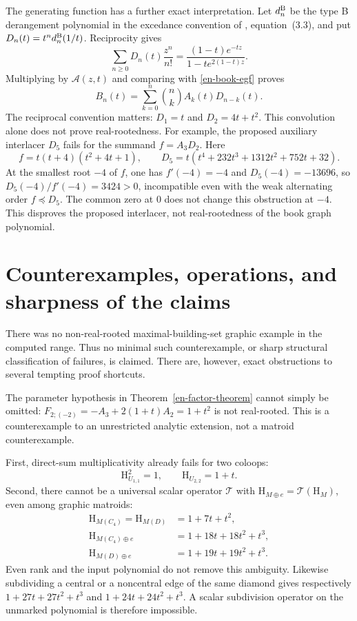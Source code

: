\documentclass[12pt]{amsart}
\theoremstyle{definition}
\theoremstyle{remark}
\numberwithin{equation}{section}
\newcommand{\HCh}{\mathrm{H}}
\begin{document}
The generating function has a further exact interpretation. Let $d_n^{\rm B}$ be the type B derangement polynomial in the excedance convention of \cite{Ma20}, equation~(3.3), and put $D_n(t)=t^n d_n^{\rm B}(1/t)$. Reciprocity gives
\[
 \sum_{n\geq0}D_n(t)\frac{z^n}{n!}
 =\frac{(1-t)e^{-tz}}{1-t e^{2(1-t)z}}.
\]
Multiplying by $\mathcal A(z,t)$ and comparing with \eqref{en-book-egf} proves
\begin{equation}\label{en-book-convolution}
 B_n(t)=\sum_{k=0}^n\binom nk A_k(t)D_{n-k}(t).
\end{equation}
The reciprocal convention matters: $D_1=t$ and $D_2=4t+t^2$. This convolution alone does not prove real-rootedness. For example, the proposed auxiliary interlacer $D_5$ fails for the summand $f=A_3D_2$. Here
\[
 f=t(t+4)(t^2+4t+1),\qquad
 D_5=t(t^4+232t^3+1312t^2+752t+32).
\]
At the smallest root $-4$ of $f$, one has $f'(-4)=-4$ and $D_5(-4)=-13696$, so $D_5(-4)/f'(-4)=3424>0$, incompatible even with the weak alternating order $f\preceq D_5$. The common zero at $0$ does not change this obstruction at $-4$. This disproves the proposed interlacer, not real-rootedness of the book graph polynomial.

\section{Counterexamples, operations, and sharpness of the claims}
There was no non-real-rooted maximal-building-set graphic example in the computed range. Thus no minimal such counterexample, or sharp structural classification of failures, is claimed. There are, however, exact obstructions to several tempting proof shortcuts.

The parameter hypothesis in Theorem~\ref{en-factor-theorem} cannot simply be omitted: $F_{2;(-2)}=-A_3+2(1+t)A_2=1+t^2$ is not real-rooted. This is a counterexample to an unrestricted analytic extension, not a matroid counterexample.

First, direct-sum multiplicativity already fails for two coloops:
\[
 \HCh_{U_{1,1}}^2=1,\qquad \HCh_{U_{2,2}}=1+t.
\]
Second, there cannot be a universal scalar operator $\mathcal T$ with $\HCh_{M\oplus e}=\mathcal T(\HCh_M)$, even among graphic matroids:
\begin{align*}
 \HCh_{M(C_4)}=\HCh_{M(D)}&=1+7t+t^2,\\
 \HCh_{M(C_4)\oplus e}&=1+18t+18t^2+t^3,\\
 \HCh_{M(D)\oplus e}&=1+19t+19t^2+t^3.
\end{align*}
Even rank and the input polynomial do not remove this ambiguity. Likewise subdividing a central or a noncentral edge of the same diamond gives respectively $1+27t+27t^2+t^3$ and $1+24t+24t^2+t^3$. A scalar subdivision operator on the unmarked polynomial is therefore impossible.
\end{document}
